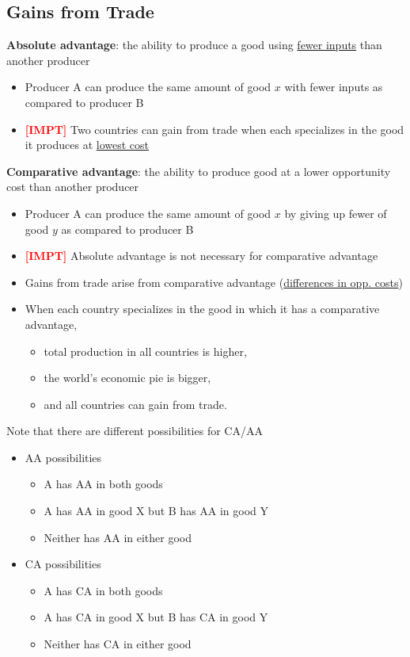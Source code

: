 \documentclass{article}
\newcommand{\impt}[0]{\textcolor{red}{\textbf{[IMPT] }}}
\begin{document}
\begin{multicols}{2}
\subsection{Gains from Trade}
\textbf{Absolute advantage}: the ability to produce a good using \underline{fewer inputs} than another producer
\begin{itemize}
	\item Producer A can produce the same amount of good $x$ with fewer inputs as compared to producer B
	\item \impt Two countries can gain from trade when each specializes in the good it produces at \underline{lowest cost}
\end{itemize}
\textbf{Comparative advantage}: the ability to produce good at a lower opportunity cost than another producer
\begin{itemize}
	\item Producer A can produce the same amount of good $x$ by giving up fewer of good $y$ as compared to producer B
	\item \impt Absolute advantage is not necessary for comparative advantage
	\item Gains from trade arise from comparative advantage (\underline{differences in opp. costs})
	\item When each country specializes in the good in which it has a comparative advantage,
	\begin{itemize}
		\item total production in all countries is higher,
		\item the world's economic pie is bigger,
		\item and all countries can gain from trade.
	\end{itemize}
\end{itemize}
Note that there are different possibilities for CA/AA
\begin{itemize}
	\item AA possibilities
	\begin{itemize}
		\item A has AA in both goods
		\item A has AA in good X but B has AA in good Y
		\item Neither has AA in either good
	\end{itemize}
	\item CA possibilities
	\begin{itemize}
		\item A has CA in both goods
		\item A has CA in good X but B has CA in good Y
		\item Neither has CA in either good
	\end{itemize}
\end{itemize}


\end{multicols}
\end{document}
